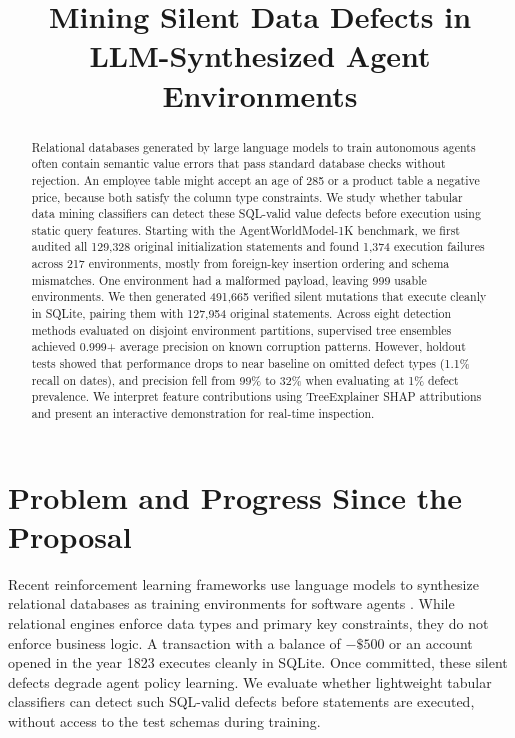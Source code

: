 \documentclass[conference]{IEEEtran}
\begin{document}
\title{Mining Silent Data Defects in LLM-Synthesized Agent Environments}
\author{
}
\maketitle

\begin{abstract}
Relational databases generated by large language models to train autonomous agents often contain semantic value errors that pass standard database checks without rejection. An employee table might accept an age of 285 or a product table a negative price, because both satisfy the column type constraints. We study whether tabular data mining classifiers can detect these SQL-valid value defects before execution using static query features. Starting with the AgentWorldModel-1K benchmark, we first audited all 129,328 original initialization statements and found 1,374 execution failures across 217 environments, mostly from foreign-key insertion ordering and schema mismatches. One environment had a malformed payload, leaving 999 usable environments. We then generated 491,665 verified silent mutations that execute cleanly in SQLite, pairing them with 127,954 original statements. Across eight detection methods evaluated on disjoint environment partitions, supervised tree ensembles achieved 0.999+ average precision on known corruption patterns. However, holdout tests showed that performance drops to near baseline on omitted defect types (1.1\% recall on dates), and precision fell from 99\% to 32\% when evaluating at 1\% defect prevalence. We interpret feature contributions using TreeExplainer SHAP attributions and present an interactive demonstration for real-time inspection.
\end{abstract}

\section{Problem and Progress Since the Proposal}
Recent reinforcement learning frameworks use language models to synthesize relational databases as training environments for software agents \cite{wang2026awm}. While relational engines enforce data types and primary key constraints, they do not enforce business logic. A transaction with a balance of $-\$500$ or an account opened in the year 1823 executes cleanly in SQLite. Once committed, these silent defects degrade agent policy learning. We evaluate whether lightweight tabular classifiers can detect such SQL-valid defects before statements are executed, without access to the test schemas during training.
\end{document}
